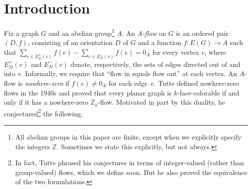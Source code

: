 \documentclass[a4paper,12pt]{article}
\theoremstyle{plain}
\theoremstyle{definition}
\newcommand{\Z}{\mathbb{Z}}
\renewcommand\ge\geqslant
\begin{document}
\date{}
\maketitle
\begin{abstract}
Fix an abelian group $A$, a graph $G$, and nowhere-zero $A$-flows $f'$ and $f''$ on $G$. Now $f'$ and $f''$ are \emph{$A$-flow-adjacent} if there exists a cycle $C$ in $G$ such that $f'(e)-f''(e)=0$ for all edges $e\notin E(C)$. 
And $f'$ and $f''$ are \emph{$A$-flow-equivalent} if there exists a sequence $f_0,\ldots,f_s$ of $A$-flows such that $f_0=f'$, $f_s=f''$, and $f_i$ and $f_{i-1}$ are $A$-flow-adjacent for all $i\in[s]$.
Given a group $A$, we seek conditions on a graph $G$ such that all $A$-flows on $G$ are pairwise $A$-flow-equivalent; in this case, we say that $G$ is \emph{$A$-flow-connected}. Analogously, we define $k$-flow-connectedness for nowhere-zero (integer) $k$-flows. The notions of $A$-flow-connectedness and $k$-flow-connectedness were first investigated by Esperet et al., who showed, among other results, that every $2$-edge-connected graph is $A$-flow-connected whenever $A=\mathbb{Z}_2^8$ or $|A| \ge 1.15\times 10^{694}$. 

In this paper, we first characterize the graphs that are $\Z_3$-flow-connected and that are $3$-flow-connected. We show that every 2-edge-connected graph is $A$-flow-connected if and only if this is true for every 2-edge-connected \emph{cubic} graphs. We show that all cubic bipartite graphs are $\Z_4$-flow-connected, and construct other cubic graphs that are and are not $\Z_4$-flow-connected. We conjecture that every Eulerian graph is $k$-flow-connected and $A$-flow-connected whenever $k$ or $|A|$ is at least 4; and provide evidence for this conjecture. Finally, we consider $4$-edge-connected graphs $G$. Here, we show that $G$ is $A$-flow-connected whenever $|A|\ge 5.3\times 10^6$.
\end{abstract}

\section{Introduction}
\label{intro-sec}
Fix a graph $G$ and an abelian group\footnote{All abelian groups in this paper are finite, except when we explicitly specify the integers $\mathbb{Z}$. Sometimes we state this explicitly, but not always.} $A$.
An \emph{$A$-flow} on $G$ is an ordered pair $(D,f)$, consisting of an orientation $D$ of $G$ and a function $f:E(G)\to A$ such that
$\sum_{e\in E_D^+(v)} f(e)
-
\sum_{e\in E_D^-(v)} f(e)
=0_A$
for every vertex $v$, where $E_D^+(v)$ and $E_D^-(v)$ denote, respectively, the sets of edges directed out of and into $v$.
Informally, we require that ``flow in equals flow out'' at each vertex.  An $A$-flow is \emph{nowhere-zero} if $f(e)\ne 0_A$ for each edge~$e$.  Tutte defined nowhere-zero flows in the 1940s and proved
that every planar
graph is $k$-face-colorable if and only if it has a nowhere-zero $\Z_k$-flow.  Motivated in part by this
duality, he conjectured\footnote{In fact,  Tutte phrased his conjectures in terms of integer-valued (rather than group-valued) flows, which we define soon.  But he also proved  the equivalence of the two formulations.} 
the following.
\end{document}
